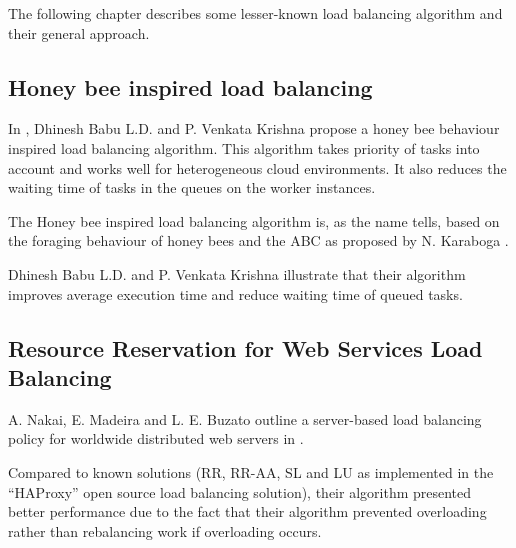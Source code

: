 The following chapter describes some lesser-known load balancing algorithm and
their general approach.

\subsection{Honey bee inspired load balancing}

In \cite{honeybee}, Dhinesh Babu L.D. and P. Venkata Krishna propose a honey bee
behaviour inspired load balancing algorithm.
This algorithm takes priority of tasks into account and works well for
heterogeneous cloud environments.
It also reduces the waiting time of tasks in the queues on the worker instances.

The Honey bee inspired load balancing algorithm is, as the name tells, based on
the foraging behaviour of honey bees and the \ac{ABC} as proposed by
N. Karaboga \cite{honeybee}.

Dhinesh Babu L.D. and P. Venkata Krishna illustrate that their algorithm
improves average execution time and reduce waiting time of queued tasks.

\subsection{Resource Reservation for Web Services Load Balancing}

A. Nakai, E. Madeira and L. E. Buzato outline a server-based load balancing
policy for worldwide distributed web servers in \cite{nakai}.

Compared to known solutions (\ac{RR}, \ac{RR-AA}, \ac{SL} and \ac{LU} as
implemented in the ``HAProxy'' open source load balancing solution), their
algorithm presented better performance due to the fact that their algorithm
prevented overloading rather than rebalancing work if overloading occurs.


